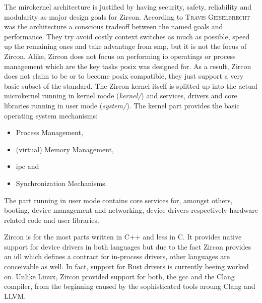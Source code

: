 The mirokernel architecture is justified by having security, safety, reliability and modularity as major design goals for Zircon.
According to \textsc{Travis Geiselbrecht} was the architecture a conscious tradeoff between the named goals and performance\cite{chat-zircon-arch}.
They try avoid costly context switches as much as possible, speed up the remaining ones and take advantage from \ac{smp}, but it is not the focus of Zircon.
Alike, Zircon does not focus on performing \ac{io} operatings or process management which are the key tasks \ac{posix} was designed for\cite{chat-zircon-arch}.
As a result, Zircon does not claim to be or to become \ac{posix} compatible, they just support a very basic subset of the standard\cite{zircon-libc-posix}.
The Zircon kernel itself is splitted up into the actual microkernel running in kernel mode (\textit{kernel/}) and services, drivers and core libraries running in user mode (\textit{system/})\cite{zircon-intro}.
The kernel part provides the basic operating system mechanisms: 
\begin{itemize}
    \item Process Management,
    \item (virtual) Memory Management,
    \item \acl{ipc} and
    \item Synchronization Mechanisms\cite{zircon-intro}.
\end{itemize}
The part running in user mode contains core services for, amongst others, booting, device management and networking, device drivers respectively hardware related code and user libraries.

Zircon is for the most parts written in C++ and less in C.
It provides native support for device drivers in both languages but due to the fact Zircon provides an \ac{idl} which defines a contract for in-process drivers, other languages are conceivable as well.
In fact, support for Rust drivers is currently beeing worked on\cite{chat-zircon-arch}.
Unlike Linux, Zircon provided support for both, the \ac{gcc} and the Clang compiler, from the beginning caused by the sophisticated tools aroung Clang and LLVM\@.


